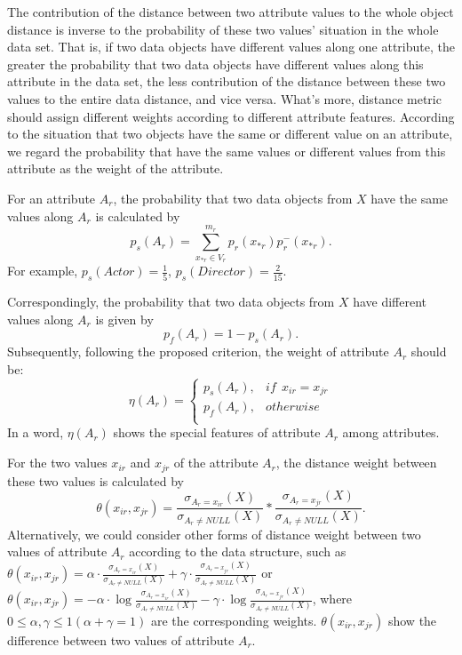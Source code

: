 \documentclass[review]{elsarticle}
\begin{document}
The contribution of the distance between two attribute values to the whole object distance is inverse to the probability of these two values' situation in the whole data set. That is, if two data objects have different values along one attribute, the greater the probability that two data objects have different values along this attribute in the data set, the less contribution of the distance between these two values to the entire data distance, and vice versa. What's more, distance metric should assign different weights according to different attribute features. According to the situation that two objects have the same or different value on an attribute, we regard the probability that have the same values or different values from this attribute as the weight of the attribute.

For an attribute $A_r$, the probability that two data objects from $X$ have the same values along $A_r$ is calculated by
\begin{equation}
p_s(A_r) = \sum_{x_{*r} \in V_r}^{m_r}p_r(x_{*r})p_r^-(x_{*r}).
\label{equ5}
\end{equation}
For example, $p_s(Actor) = \frac{1}{5}$, $p_s(Director) = \frac{2}{15}$.

Correspondingly, the probability that two data objects from $X$ have different values along $A_r$ is given by
\begin{equation}
p_f(A_r) = 1 - p_s(A_r).
\label{equ6}
\end{equation}
Subsequently, following the proposed criterion, the weight of attribute $A_r$ should be:
\begin{equation}
\label{equ7}
\eta(A_r)=
\left\{\begin{array}{cc}
  p_s(A_r), & if\ \ x_{ir} = x_{jr} \\
  p_f(A_r), & otherwise \\
  \end{array} \right.
\end{equation}
In a word, $\eta(A_r)$ shows the special features of attribute $A_r$ among attributes.

For the two values $x_{ir}$ and $x_{jr}$ of the attribute $A_r$, the distance weight between these two values is calculated by
\begin{equation}
\theta(x_{ir},x_{jr}) = \frac{\sigma_{A_r = x_{ir}}(X)}{\sigma_{A_r \neq NULL}(X)} * \frac{\sigma_{A_r = x_{jr}}(X)}{\sigma_{A_r \neq NULL}(X)}.
\label{equ8}
\end{equation}
Alternatively, we could consider other forms of distance weight between two values of attribute $A_r$ according to the data structure, such as $\theta(x_{ir},x_{jr}) = \alpha \cdot \frac{\sigma_{A_r = x_{ir}}(X)}{\sigma_{A_r \neq NULL}(X)} + \gamma \cdot \frac{\sigma_{A_r = x_{jr}}(X)}{\sigma_{A_r \neq NULL}(X)}$ or $\theta(x_{ir},x_{jr}) = -\alpha \cdot \log{\frac{\sigma_{A_r = x_{ir}}(X)}{\sigma_{A_r \neq NULL}(X)}} - \gamma \cdot \log{\frac{\sigma_{A_r = x_{jr}}(X)}{\sigma_{A_r \neq NULL}(X)}}$, where $0 \leq \alpha,\gamma \leq 1 (\alpha+\gamma = 1)$ are the corresponding weights. $\theta(x_{ir},x_{jr})$ show the difference between two values of attribute $A_r$.
\end{document}
